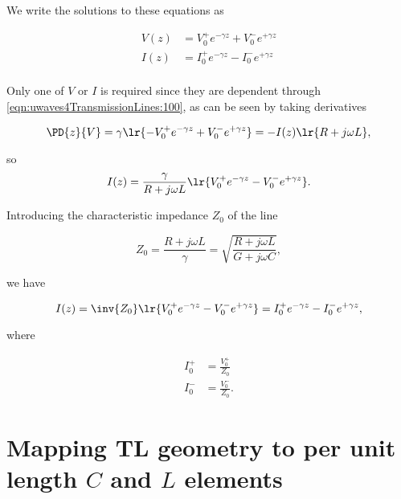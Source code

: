 We write the solutions to these equations as

\begin{equation}\label{eqn:uwaves4TransmissionLines:200}
\begin{aligned}
V(z) &= V_0^{+} e^{-\gamma z} + V_0^{-} e^{+\gamma z} \\
I(z) &= I_0^{+} e^{-\gamma z} - I_0^{-} e^{+\gamma z} \\
\end{aligned}
\end{equation}

Only one of \( V \) or \( I \) is required since they are dependent through \cref{eqn:uwaves4TransmissionLines:100}, as can be seen by taking derivatives

\begin{dmath}\label{eqn:uwaves4TransmissionLines:220}
\PD{z}{V}
= \gamma \lr{ -V_0^{+} e^{-\gamma z} + V_0^{-} e^{+\gamma z} }
=
-I(z) \lr{ R + j \omega L },
\end{dmath}

so
\begin{equation}\label{eqn:uwaves4TransmissionLines:240}
I(z)
=
\frac{\gamma}{ R + j \omega L } \lr{ V_0^{+} e^{-\gamma z} - V_0^{-} e^{+\gamma z} }.
\end{equation}

Introducing the characteristic impedance \( Z_0 \) of the line

\begin{dmath}\label{eqn:uwaves4TransmissionLines:260}
Z_0
= \frac{R + j \omega L}{\gamma}
= \sqrt{ \frac{R + j \omega L}{G + j \omega C} },
\end{dmath}

we have

\begin{dmath}\label{eqn:uwaves4TransmissionLines:280}
I(z)
=
\inv{Z_0} \lr{ V_0^{+} e^{-\gamma z} - V_0^{-} e^{+\gamma z} }
=
I_0^{+} e^{-\gamma z} - I_0^{-} e^{+\gamma z},
\end{dmath}

where

\begin{equation}\label{eqn:uwaves4TransmissionLines:300}
\begin{aligned}
I_0^{+} &= \frac{V_0^{+}}{Z_0} \\
I_0^{-} &= \frac{V_0^{-}}{Z_0}.
\end{aligned}
\end{equation}

\section{Mapping TL geometry to per unit length \( C \) and \( L \) elements}

